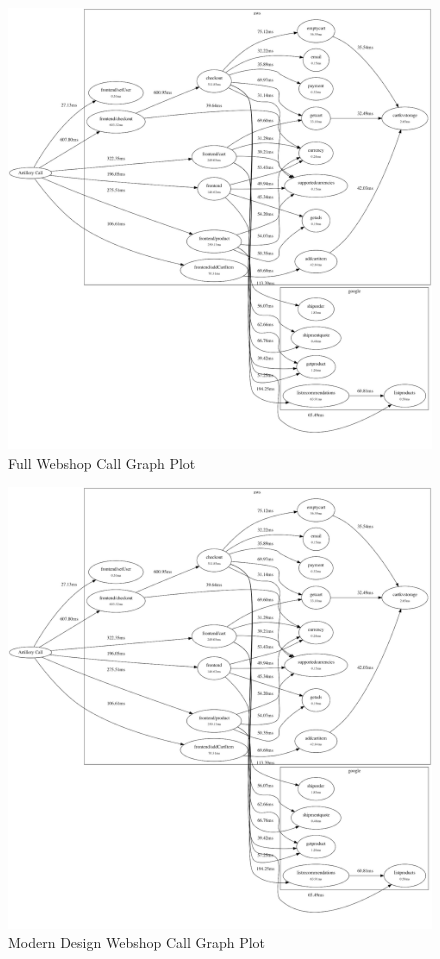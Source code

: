 \documentclass[../main.tex]{subfiles}
\begin{document}
\begin{figure}
\begin{center}
  \includegraphics[width=\linewidth,keepaspectratio]{./webshop-call-graph.png}
\end{center}
\caption{Full Webshop Call Graph Plot}%
\label{fig:webshop_full_call_graph}
\end{figure}

\begin{figure}
\begin{center}
  \includegraphics[width=\linewidth,keepaspectratio]{./webshop-call-graph.png}
\end{center}
\caption{Modern Design Webshop Call Graph Plot}%
\label{fig:webshop_modern_call_graph}
\end{figure}
\end{document}
